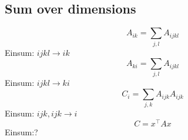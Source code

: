 \documentclass[9pt]{article}
\begin{document}
\subsection*{Sum over dimensions}
\begin{equation*}
	A_{ik} = \sum_{j,l} A_{ijkl}
\end{equation*}
Einsum: $ijkl\rightarrow ik$
\begin{equation*}
	A_{ki} = \sum_{j,l} A_{ijkl}
\end{equation*}
Einsum: $ijkl\rightarrow ki$
\begin{equation*}
	C_{i} = \sum_{j,k} A_{ijk}A_{ijk}
\end{equation*}
Einsum: $ijk,ijk\rightarrow i$
\begin{equation*}
	C=x^{\top}Ax
\end{equation*}
Einsum:?
\end{document}
